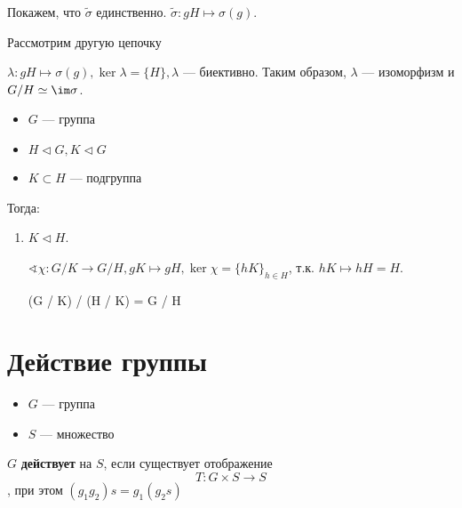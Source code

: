 Покажем, что \(\tilde{\sigma}\) единственно. \(\tilde{\sigma} : gH \mapsto \sigma(g)\).

Рассмотрим другую цепочку 

\(\lambda : gH \mapsto \sigma(g), \ker \lambda = \{H\}, \lambda\) --- биективно. Таким образом, \(\lambda\) --- изоморфизм и \(G / H \simeq \im \sigma\).

\begin{remark}\itemfix
    \begin{itemize}
        \item \(G\) --- группа
        \item \(H \vartriangleleft G, K \vartriangleleft G\)
        \item \(K \subset H\) --- подгруппа
    \end{itemize}

    Тогда:
    \begin{enumerate}
        \item \(K \vartriangleleft H\).

              \(\sphericalangle \chi : G / K \to G / H, gK \mapsto gH, \ker \chi = \{hK\}_{h \in H}\), т.к. \(hK \mapsto hH = H\).

              \begin{myemph}
                  (G / K) / (H / K) = G / H
              \end{myemph}
    \end{enumerate}
\end{remark}

\section{Действие группы}

\begin{definition}\itemfix
    \begin{itemize}
        \item \(G\) --- группа
        \item \(S\) --- множество
    \end{itemize}

    \(G\) \textbf{действует} на \(S\), если существует отображение
    \[T : G \times S \to S\]
    , при этом \((g_1g_2)s = g_1(g_2s)\)
\end{definition}

